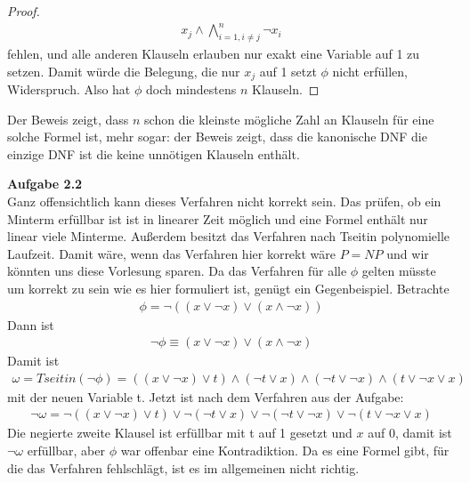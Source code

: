 \documentclass[a4paper,10pt]{article}
\begin{document}
\begin{enumerate}
\begin{proof}
\begin{align*}
x_j \wedge \bigwedge_{i=1, i \neq j}^n \neg x_i 
\end{align*}  
fehlen, und alle anderen Klauseln erlauben nur exakt eine Variable auf 1 zu setzen. Damit würde die Belegung, die nur $x_j$ auf 1 setzt $\phi$ nicht erfüllen, Widerspruch. Also hat $\phi$ doch mindestens $n$ Klauseln.
\end{proof}
Der Beweis zeigt, dass $n$ schon die kleinste mögliche Zahl an Klauseln für eine solche Formel ist, mehr sogar: der Beweis zeigt, dass die kanonische DNF die einzige DNF ist die keine unnötigen Klauseln enthält. 
\end{enumerate}


\noindent\textbf{Aufgabe 2.2}\\
Ganz offensichtlich kann dieses Verfahren nicht korrekt sein. Das prüfen, ob ein Minterm erfüllbar ist ist in linearer Zeit möglich und eine Formel enthält nur linear viele Minterme. Außerdem besitzt das Verfahren nach Tseitin polynomielle Laufzeit. Damit wäre, wenn das Verfahren hier korrekt wäre $P = NP$ und wir könnten uns diese Vorlesung sparen. Da das Verfahren für alle $\phi$ gelten müsste um korrekt zu sein wie es hier formuliert ist, genügt ein Gegenbeispiel. Betrachte
\begin{align*}
\phi = \neg ((x \vee \neg x) \vee (x \wedge \neg x))
\end{align*} 
Dann ist 
\begin{align*}
\neg \phi \equiv (x \vee \neg x) \vee (x \wedge \neg x)
\end{align*}
Damit ist 
\begin{align*}
\omega = Tseitin(\neg \phi) = ((x \vee \neg x) \vee t) \wedge (\neg t \vee x) \wedge (\neg t \vee \neg x) \wedge (t \vee \neg x \vee x)
\end{align*}
mit der neuen Variable t. Jetzt ist nach dem Verfahren aus der Aufgabe:
\begin{align*}
\neg \omega = \neg((x \vee \neg x) \vee t) \vee \neg(\neg t \vee x) \vee \neg(\neg t \vee \neg x) \vee \neg(t \vee \neg x \vee x)
\end{align*}
Die negierte zweite Klausel ist erfüllbar mit t auf 1 gesetzt und $x$ auf 0, damit ist $\neg \omega$ erfüllbar, aber $\phi$ war offenbar eine Kontradiktion. Da es eine Formel gibt, für die das Verfahren fehlschlägt, ist es im allgemeinen nicht richtig.
\end{document}
